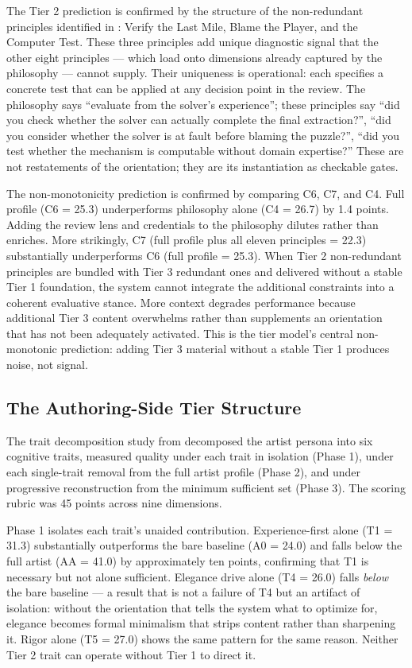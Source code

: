 The Tier 2 prediction is confirmed by the structure of the non-redundant principles
identified in \citeauthor{paper1} \cite{paper1}: Verify the Last Mile, Blame the Player,
and the Computer Test. These three principles add unique diagnostic signal that the other
eight principles --- which load onto dimensions already captured by the philosophy ---
cannot supply. Their uniqueness is operational: each specifies a concrete test that can
be applied at any decision point in the review. The philosophy says ``evaluate from the
solver's experience''; these principles say ``did you check whether the solver can
actually complete the final extraction?'', ``did you consider whether the solver is at
fault before blaming the puzzle?'', ``did you test whether the mechanism is computable
without domain expertise?'' These are not restatements of the orientation; they are its
instantiation as checkable gates.

The non-monotonicity prediction is confirmed by comparing C6, C7, and C4. Full profile
(C6 = 25.3) underperforms philosophy alone (C4 = 26.7) by 1.4 points. Adding the review
lens and credentials to the philosophy dilutes rather than enriches. More strikingly, C7
(full profile plus all eleven principles = 22.3) substantially underperforms C6 (full
profile = 25.3). When Tier 2 non-redundant principles are bundled with Tier 3 redundant
ones and delivered without a stable Tier 1 foundation, the system cannot integrate the
additional constraints into a coherent evaluative stance. More context degrades
performance because additional Tier 3 content overwhelms rather than supplements an
orientation that has not been adequately activated. This is the tier model's central
non-monotonic prediction: adding Tier 3 material without a stable Tier 1 produces noise,
not signal.

\subsection{The Authoring-Side Tier Structure}

The trait decomposition study from \citeauthor{paper6} \cite{paper6} decomposed the
artist persona into six cognitive traits, measured quality under each trait in isolation
(Phase 1), under each single-trait removal from the full artist profile (Phase 2), and
under progressive reconstruction from the minimum sufficient set (Phase 3). The scoring
rubric was 45 points across nine dimensions.

Phase 1 isolates each trait's unaided contribution. Experience-first alone (T1 = 31.3)
substantially outperforms the bare baseline (A0 = 24.0) and falls below the full artist
(AA = 41.0) by approximately ten points, confirming that T1 is necessary but not alone
sufficient. Elegance drive alone (T4 = 26.0) falls \textit{below} the bare baseline ---
a result that is not a failure of T4 but an artifact of isolation: without the
orientation that tells the system what to optimize for, elegance becomes formal
minimalism that strips content rather than sharpening it. Rigor alone (T5 = 27.0) shows
the same pattern for the same reason. Neither Tier 2 trait can operate without Tier 1 to
direct it.

